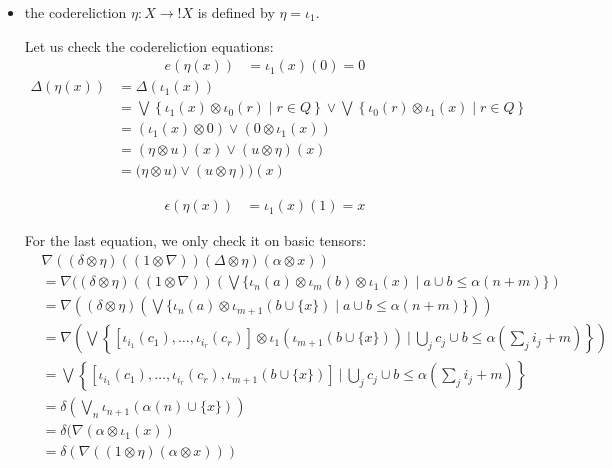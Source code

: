 \begin{itemize}
\item the codereliction $\eta: X\to !X$ is defined by 
$\eta= \iota_{1}$.

Let us check the codereliction equations:
\begin{align*}
e(\eta(x)) & = \iota_{1}(x)(0)=0
\end{align*}
\begin{align*}
\Delta(\eta(x)) & = \Delta(\iota_{1}(x)) \\
&=
\bigvee\left\{\iota_{1}(x)\otimes \iota_{0}(r) \mid r\in Q\right\}\vee
\bigvee\left\{\iota_{0}(r)\otimes \iota_{1}(x) \mid r\in Q\right\}
\\
&=
(\iota_{1}(x)\otimes 0 )\vee
(0\otimes \iota_{1}(x) )
\\
&=
(\eta\otimes u)(x)\vee(u\otimes \eta) (x) \\
&=
\Big(\eta\otimes u)\vee(u\otimes \eta)\Big) (x) 
\end{align*}

\begin{align*}
\epsilon(\eta(x))&= \iota_{1}(x)(1) =x
\end{align*}

For the last equation, we only check it on basic tensors:
\begin{align*}
& \nabla((\delta\otimes \eta)((1\otimes \nabla))(\Delta\otimes \eta)(\alpha\otimes x)) \\
&=\nabla((\delta\otimes \eta)((1\otimes \nabla))\left(
\bigvee
\{\iota_{n}(a)\otimes \iota_{m}(b)\otimes \iota_{1}(x)\mid a\cup b \leq \alpha(n+m)\}
\right)\\ 
&=\nabla\left ((\delta\otimes \eta)\left(
\bigvee
\{\iota_{n}(a)\otimes \iota_{m+1}(b\cup \{x\})\mid a\cup b \leq \alpha(n+m)\}\right)\right)
\\ 
&=\nabla\left (
\bigvee\left 
\{[\iota_{i_{1}}(c_{1}),\dots,\iota_{i_{r}}(c_{r})]
\otimes \iota_{1}( \iota_{m+1}(b\cup \{x\}))\ \Bigg \vert \ 
\bigcup_{j}c_{j}\cup b \leq \alpha\left (\sum_{j}i_{j}+m\right )\right\}\right)
\\ 
&=
\bigvee\left\{
[\iota_{i_{1}}(c_{1}),\dots,\iota_{i_{r}}(c_{r}), \iota_{m+1}(b\cup \{x\})] \ \Bigg \vert \
\bigcup_{j}c_{j}\cup b \leq \alpha\left (\sum_{j}i_{j}+m\right )\right\}
\\
&=
\delta\left(
\bigvee_{n}\iota_{n+1}(
\alpha(n)\cup \{x\})
\right)
\\
&=
\delta(\nabla(\alpha\otimes \iota_{1}(x))
\\
&=
\delta(\nabla((1\otimes \eta)(\alpha\otimes x))) 
\end{align*}



\end{itemize}


